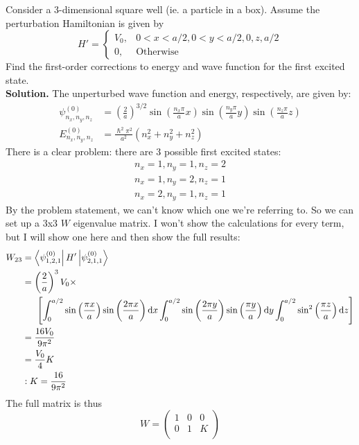 \documentclass[a4paper]{article}
\begin{document}
\begin{eg}
	Consider a 3-dimensional square well (ie. a particle in a box).
	Assume the perturbation Hamiltonian is given by
	\[ H' = \begin{cases}
			V_0, & 0<x<a/2, 0<y<a/2, 0,z,a/2\\
			0,   & \text{Otherwise}
		\end{cases}
	\]
	Find the first-order corrections to energy and wave function for the
	first excited state.\\
	\textbf{Solution.}
	The unperturbed wave function and energy, respectively, are given by:
	\begin{align*}
		\psi_{n_x,n_y,n_z}^{(0)} &= \left(\frac{2}{a}\right)^{3/2}
			\sin\left(\frac{n_x\pi}{a}x\right)
			\sin\left(\frac{n_y\pi}{a}y\right)
			\sin\left(\frac{n_z\pi}{a}z\right)\\
		E_{n_x,n_y,n_z}^{(0)} &= \frac{\hslash^2\pi^2}{a^2}\left(
			n_x^2+n_y^2+n_z^2\right)
	\end{align*}
	There is a clear problem: there are 3 possible first excited states:
	\begin{gather}
		n_x = 1, n_y = 1, n_z = 2\\
		n_x = 1, n_y = 2, n_z = 1\\
		n_x = 2, n_y = 1, n_z = 1
	\end{gather}
	By the problem statement, we can't know which one we're referring to.
	So we can set up a 3x3 $W$ eigenvalue matrix. I won't show the
	calculations for every term, but I will show one here and then show
	the full results:
	\begin{align*}
		W_{23}&=\left\langle \psi_{1,2,1}^{(0)} \right\rvert H'\left\lvert \psi_{2,1,1}^{(0)}\right\rangle\\
		      &=\left(\frac{2}{a}\right)^3V_0\times\\
		      &\hspace{1.5em}\left[
			\int_0^{a/2}
				\sin\left(\frac{\pi x}{a}\right)
				\sin\left(\frac{2\pi x}{a}\right)\mathrm{d} x
			\int_0^{a/2}
				\sin\left(\frac{2\pi y}{a}\right)
				\sin\left(\frac{\pi y}{a}\right)\mathrm{d} y
			\int_0^{a/2}
				\sin^2\left(\frac{\pi z}{a}\right)\mathrm{d} z
		\right]\\
		&= \frac{16V_0}{9\pi^2}\\
		&= \frac{V_0}{4}K\\
		&: K = \frac{16}{9\pi^2}
	\end{align*}
	The full matrix is thus
	\[
		W = 
	\begin{pmatrix}
		1 & 0 & 0\\
		0 & 1 & K\\

\end{pmatrix}\]
\end{eg}
\end{document}
